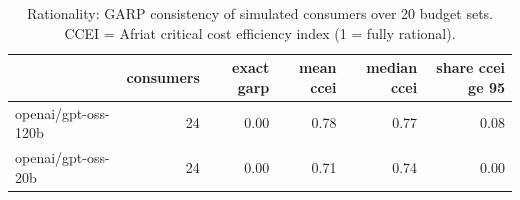\begin{table}[!htbp]\centering\small
\caption{Rationality: GARP consistency of simulated consumers over 20 budget sets. CCEI = Afriat critical cost efficiency index (1 = fully rational).}\label{tab:garp}
\begin{tabular}{lrrrrr}
\hline
 & consumers & exact garp & mean ccei & median ccei & share ccei ge 95 \\ \hline
openai/gpt-oss-120b & 24 & 0.00 & 0.78 & 0.77 & 0.08 \\
openai/gpt-oss-20b & 24 & 0.00 & 0.71 & 0.74 & 0.00 \\
\hline
\end{tabular}
\end{table}